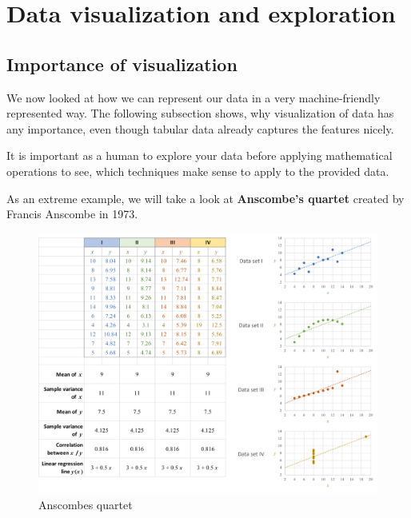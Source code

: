 \section{Data visualization and exploration}
\setcounter{figure}{0}



\subsection*{Importance of visualization}
We now looked at how we can represent our data in a very machine-friendly represented way. The following subsection shows, why visualization of data has any importance, even though tabular data already captures the features nicely.

It is important as a human to explore your data before applying mathematical operations to see, which techniques make sense to apply to the provided data. \begin{note}As an extreme example, we will take a look at \textbf{Anscombe's quartet} created by Francis Anscombe in 1973. 

\begin{figure}[h]
  \centering
  \includegraphics[width=\textwidth]{assets/visualization_and_extraction/anscombes_quartet.png}
  \caption{Anscombes quartet}
  \label{fig:2_anscombes_quartet}
\end{figure}


\end{note}
